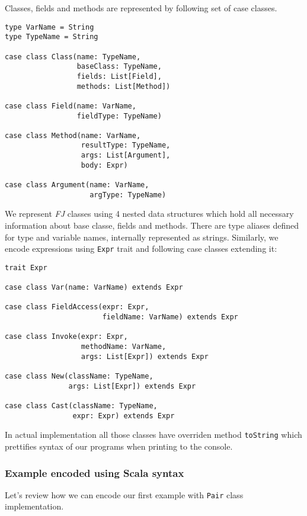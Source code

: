 \documentclass{article}[12pt]
\begin{document}
Classes, fields and methods are represented by following set of
case classes.

\begin{verbatim}
type VarName = String
type TypeName = String

case class Class(name: TypeName,
                 baseClass: TypeName,
                 fields: List[Field],
                 methods: List[Method])

case class Field(name: VarName,
                 fieldType: TypeName)

case class Method(name: VarName,
                  resultType: TypeName,
                  args: List[Argument],
                  body: Expr)

case class Argument(name: VarName,
                    argType: TypeName)
\end{verbatim}

We represent \emph{FJ} classes using 4 nested data structures
which hold all necessary information about base classe, fields
and methods. There are type aliases defined for type and variable
names, internally represented as strings. Similarly, we encode
expressions using \texttt{Expr} trait and following case classes
extending it:

\begin{verbatim}
trait Expr

case class Var(name: VarName) extends Expr

case class FieldAccess(expr: Expr,
                       fieldName: VarName) extends Expr

case class Invoke(expr: Expr,
                  methodName: VarName,
                  args: List[Expr]) extends Expr

case class New(className: TypeName,
               args: List[Expr]) extends Expr

case class Cast(className: TypeName,
                expr: Expr) extends Expr
\end{verbatim}

In actual implementation all those classes have overriden
method \texttt{toString} which prettifies syntax of our
programs when printing to the console.

\subsubsection{Example encoded using Scala syntax}

Let's review how we can encode our first example with
\texttt{Pair} class implementation.
\end{document}
